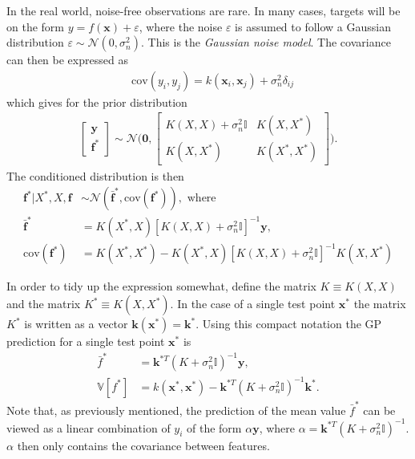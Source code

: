 \documentclass[twoside,english]{uiofysmaster}
\begin{document}
In the real world, noise-free observations are rare. In many cases, targets will be on the form $y = f(\textbf{x}) + \varepsilon$, where the noise $\varepsilon$ is assumed to follow a Gaussian distribution $\varepsilon \sim \mathcal{N}(0, \sigma_n^2)$. This is the \textit{Gaussian noise model}. The covariance can then be expressed as
\begin{align}
&\text{cov}(y_i, y_j) = k(\textbf{x}_i, \textbf{x}_j) + \sigma_n^2 \delta_{ij} 
\end{align}
which gives for the prior distribution
\begin{align}
\begin{bmatrix}
\textbf{y}\\
\textbf{f}^*
\end{bmatrix}
\sim 
\mathcal{N} \Bigg(
\boldsymbol{0},
\begin{bmatrix}
K(X, X) + \sigma_n^2 \mathbb{I} & K(X, X^*)\\
K(X, X^*) & K(X^*, X^*)
\end{bmatrix}
 \Bigg).
\end{align}
The conditioned distribution is then 
\begin{align}
\textbf{f}^* \big| X^*, X, \textbf{f} & \sim \mathcal{N}(\bar{\textbf{f}}^*, \text{cov}(\textbf{f}^*)), \text{ where} \\
\bar{\textbf{f}}^* &= K(X^*, X) [K(X, X) + \sigma_n^2 \mathbb{I}]^{-1} \textbf{y},\\
\text{cov} (\textbf{f}^*) &= K(X^*, X^*) - K(X^*, X)[K(X, X) + \sigma_n^2 \mathbb{I}]^{-1} K(X, X^*) 
\end{align}

In order to tidy up the expression somewhat, define the matrix $K \equiv K(X, X)$ and the matrix $K^* \equiv K(X, X^*)$. In the case of a single test point $\textbf{x}^*$ the matrix $K^*$ is written as a vector $\textbf{k}(\textbf{x}^*) = \textbf{k}^*$. Using this compact notation the GP prediction for a single test point $\textbf{x}^*$ is
\begin{align}
\bar{f}^* &= \textbf{k}^{*T}(K + \sigma_n^2\mathbb{I})^{-1} \textbf{y},\label{Eq:: gaussian process : GP prediction mean}\\
\mathbb{V}[f^*] &= k(\textbf{x}^*, \textbf{x}^*) - \textbf{k}^{*T}(K + \sigma_n^2 \mathbb{I})^{-1} \textbf{k}^*\label{Eq:: gaussian process : GP prediction variance}.
\end{align}
Note that, as previously mentioned, the prediction of the mean value $\bar{f}^*$ can be viewed as a linear combination of $y_i$ of the form $\alpha \textbf{y}$, where $\alpha = \textbf{k}^{*T}(K + \sigma_n^2\mathbb{I})^{-1}$. $\alpha$ then only contains the covariance between features.
\end{document}

